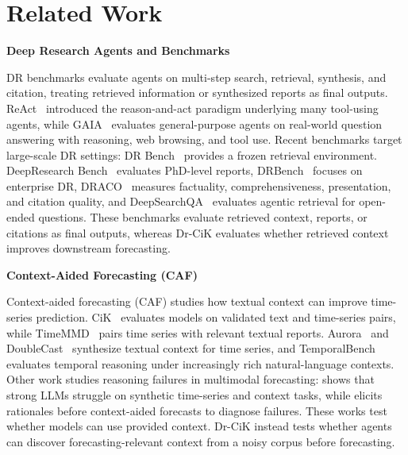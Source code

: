 \documentclass[]{servicenow}
\newcommand{\paragraphtight}[1]{%
  \par\vspace{-0.75\parskip}\vspace{0.3em}%
  \noindent\textbf{#1}\hspace{0.4em}\ignorespaces
}
\begin{document}
\section{Related Work}


\paragraphtight{Deep Research Agents and Benchmarks}
DR benchmarks evaluate agents on multi-step search, retrieval, synthesis, and citation, treating retrieved information or synthesized reports as final outputs. ReAct~\citep{yao2022react} introduced the reason-and-act paradigm underlying many tool-using agents, while GAIA~\citep{mialon2023gaia} evaluates general-purpose agents on real-world question answering with reasoning, web browsing, and tool use. Recent benchmarks target large-scale DR settings: DR Bench~\citep{bosse2025deep} provides a frozen retrieval environment. DeepResearch Bench~\citep{du2025deepresearch} evaluates PhD-level reports, DRBench~\citep{abaskohi2025drbench} focuses on enterprise DR, DRACO~\citep{zhong2026draco} measures factuality, comprehensiveness, presentation, and citation quality, and DeepSearchQA~\citep{gupta2026deepsearchqa} evaluates agentic retrieval for open-ended questions. These benchmarks evaluate retrieved context, reports, or citations as final outputs, whereas Dr-CiK evaluates whether retrieved context improves downstream forecasting.



\paragraphtight{Context-Aided Forecasting (CAF)}
Context-aided forecasting (CAF) studies how textual context can improve time-series prediction. CiK~\citep{williams2024context} evaluates models on validated text and time-series pairs, while TimeMMD~\citep{liu2024time} pairs time series with relevant textual reports. Aurora~\citep{wu2026aurora} and DoubleCast~\citep{zheng2026overcoming} synthesize textual context for time series, and TemporalBench~\citep{weng2026temporalbench} evaluates temporal reasoning under increasingly rich natural-language contexts. Other work studies reasoning failures in multimodal forecasting: \citet{merrill2024language} shows that strong LLMs struggle on synthetic time-series and context tasks, while \citet{ashok2025beyond} elicits rationales before context-aided forecasts to diagnose failures. These works test whether models can use provided context. Dr-CiK instead tests whether agents can discover forecasting-relevant context from a noisy corpus before forecasting.
\end{document}
